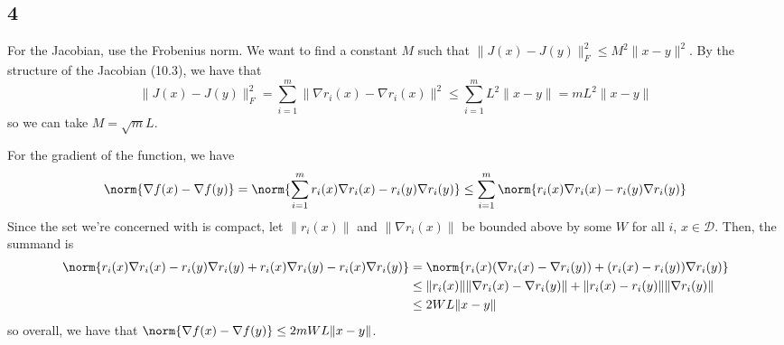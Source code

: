 \documentclass{article}
\begin{document}
\subsection*{4}
For the Jacobian, use the Frobenius norm. We want to find a constant $M$ such that $\|J(x)-J(y)\|_F^2\leq M^2\|x-y\|^2$. By the structure of the Jacobian (10.3), we have that 
\[\|J(x)-J(y)\|_F^2=\sum_{i=1}^m\|\nabla r_i(x)-\nabla r_i(x)\|^2\leq\sum_{i=1}^mL^2\|x-y\|=mL^2\|x-y\|\]
so we can take $M=\sqrt{m}L$.

For the gradient of the function, we have
\[\norm{\nabla f(x)-\nabla f(y)}=\norm{\sum_{i=1}^mr_i(x)\nabla r_i(x)-r_i(y)\nabla r_i(y)}\leq\sum_{i=1}^m\norm{r_i(x)\nabla r_i(x)-r_i(y)\nabla r_i(y)}\]
Since the set we're concerned with is compact, let $\|r_i(x)\|$ and $\|\nabla r_i(x)\|$ be bounded above by some $W$ for all $i$, $x\in\mathscr{D}$. Then, the summand is
\begin{align*}
    \norm{r_i(x)\nabla r_i(x)-r_i(y)\nabla r_i(y)+r_i(x)\nabla r_i(y)-r_i(x)\nabla r_i(y)}&=\norm{r_i(x)(\nabla r_i(x)-\nabla r_i(y))+(r_i(x)-r_i(y))\nabla r_i(y)}\\
                                                                                          &\leq\|r_i(x)\|\|\nabla r_i(x)-\nabla r_i(y)\|+\|r_i(x)-r_i(y)\|\|\nabla r_i(y)\|\\
                                                                                          &\leq 2WL\|x-y\|\\
\end{align*}
so overall, we have that $\norm{\nabla f(x)-\nabla f(y)}\leq2mWL\|x-y\|$.
\end{document}
